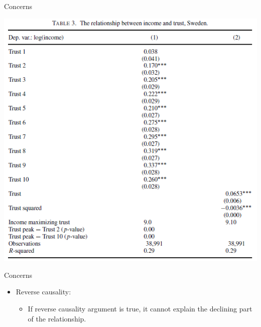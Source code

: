 \documentclass[pdftex,12pt,xcolor=pdftex,table]{beamer}
\begin{document}
\begin{frame}{Concerns}
    \begin{center}
        \includegraphics[scale=0.52]{table_3.PNG}
    \end{center}
\end{frame}

\begin{frame}{Concerns}
\begin{itemize}
    \item Reverse causality:
    \begin{itemize}
        \item If reverse causality
argument is true, it cannot explain the declining part of the relationship.
    \end{itemize}
\end{itemize}
\end{frame}
\end{document}
